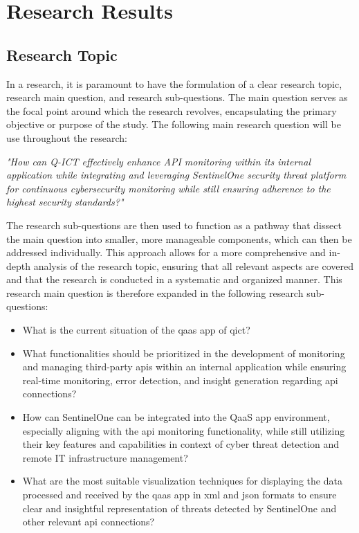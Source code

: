 \chapter{Research Results}
\begin{multicols}{2}
    \section{Research Topic}
    In a research, it is paramount to have the formulation of a clear research topic, research main question, and research
    sub-questions. The main question serves as the focal point around which the research revolves, encapsulating the primary
    objective or purpose of the study.
    The following main research question will be use throughout the research:
    \begin{center}
        \textit{"How can Q-ICT effectively enhance API monitoring within its internal application while integrating
            and leveraging SentinelOne security threat platform for continuous cybersecurity monitoring while
            still ensuring adherence to the highest security standards?"}
    \end{center}
    The research sub-questions are then used to function as a pathway that dissect the main
    question into smaller, more manageable components, which can then be addressed individually. This approach allows for a
    more comprehensive and in-depth analysis of the research topic, ensuring that all relevant aspects are covered and that the
    research is conducted in a systematic and organized manner.
    This research main question is therefore expanded in the following research sub-questions:
    \begin{itemize}
        \item What is the current situation of the \acrshort{qaas} app of \acrshort{qict}?
        \item What functionalities should be prioritized in the development of monitoring and managing third-party
              \acrshort{api}s within an internal application while ensuring real-time monitoring, error detection, and
              insight generation regarding \acrshort{api} connections?
        \item How can SentinelOne can be integrated into the QaaS app environment, especially aligning with the
              \acrshort{api} monitoring functionality, while still utilizing their key features and capabilities in
              context of cyber threat detection and remote IT infrastructure management?
        \item What are the most suitable visualization techniques for displaying the data processed and received by
              the \acrshort{qaas} app in \acrshort{xml} and \acrshort{json} formats to ensure clear and insightful
              representation of threats detected by SentinelOne and other relevant \acrshort{api} connections?
    \end{itemize}

\end{multicols}
